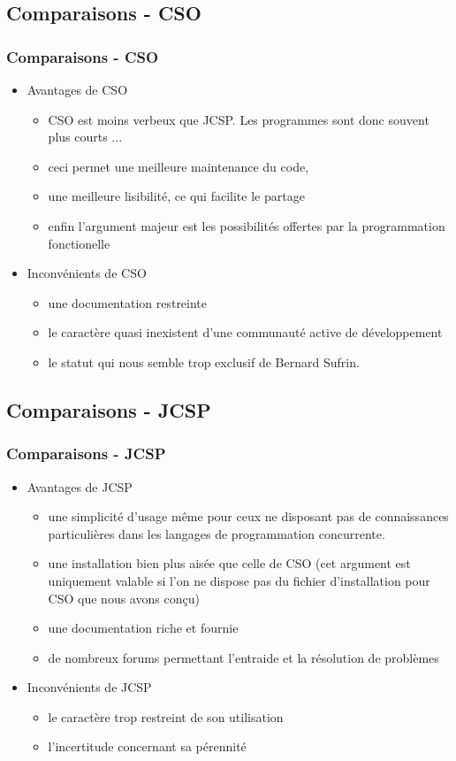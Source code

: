 \documentclass[slidetop,11pt]{beamer}
\begin{document}
\subsection{Comparaisons - CSO}
\begin{frame}
\frametitle{Comparaisons - CSO}
\begin{itemize}[<+->]
\item Avantages de CSO
\begin{itemize}[<+->]
\item CSO est moins verbeux que JCSP. Les programmes sont donc souvent plus courts ...
\item ceci permet une meilleure maintenance du code,
\item une meilleure lisibilité, ce qui facilite le partage
\item enfin l'argument majeur est les possibilités offertes par la programmation fonctionelle
\end{itemize}
\item Inconvénients de CSO
\begin{itemize}[<+->]
\item une documentation restreinte
\item le caractère quasi inexistent d'une communauté active de développement
\item le statut qui nous semble trop exclusif de Bernard Sufrin.
\end{itemize}
\end{itemize}
\end{frame}

\subsection{Comparaisons - JCSP}
\begin{frame}
\frametitle{Comparaisons - JCSP}
\begin{itemize}[<+->]
\item Avantages de JCSP
\begin{itemize}[<+->]
\item une simplicité d'usage m\^eme pour ceux ne disposant pas de connaissances particulières dans les langages de programmation concurrente.
\item une installation bien plus aisée que celle de CSO (cet argument est uniquement valable si l'on ne dispose pas du fichier d'installation pour CSO que nous avons conçu)
\item une documentation riche et fournie
\item de nombreux forums permettant l'entraide et la résolution de problèmes
\end{itemize}
\item Inconvénients de JCSP
\begin{itemize}[<+->]
\item le caractère trop restreint de son utilisation
\item l'incertitude concernant sa pérennité
\end{itemize}
\end{itemize}
\end{frame}
\end{document}
